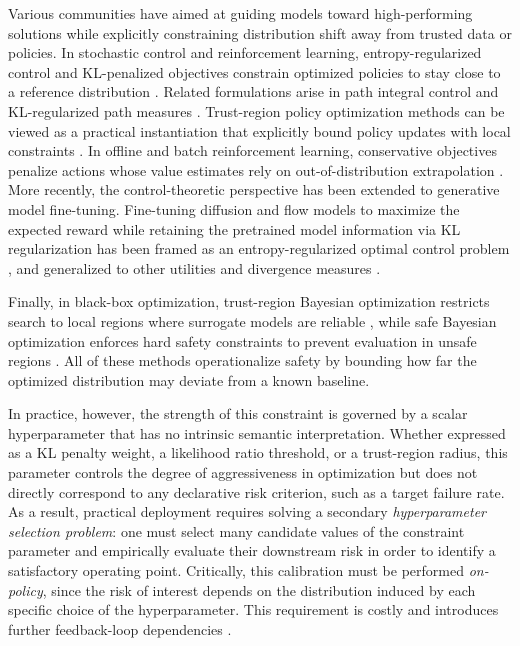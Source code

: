 Various communities have aimed at guiding models toward high-performing solutions while explicitly constraining distribution shift away from trusted data or policies.
In stochastic control and reinforcement learning, entropy-regularized control and KL-penalized objectives constrain optimized policies to stay close to a reference distribution \citep{todorov2009efficient, fox2015taming}. 
Related formulations arise in path integral control and KL-regularized path measures \citep{kappen2005path, theodorou2010generalized}. 
Trust-region policy optimization methods can be viewed as a practical instantiation that explicitly bound policy updates with local constraints \citep{schulman2015trust, schulman2017proximal}. 
In offline and batch reinforcement learning, conservative objectives penalize actions whose value estimates rely on out-of-distribution extrapolation \citep{kumar2020conservative, trabucco2021conservative}. 
More recently, the control-theoretic perspective has been extended to generative model fine-tuning. Fine-tuning diffusion and flow models to maximize the expected reward while retaining the pretrained model information via KL regularization has been framed as an entropy-regularized optimal control problem \citep{uehara2024fine, domingo2024adjoint}, and generalized to other utilities and divergence measures \citep{de2025flow}. 

Finally, in black-box optimization, trust-region Bayesian optimization restricts search to local regions where surrogate models are reliable \citep{eriksson2019scalable}, while safe Bayesian optimization enforces hard safety constraints to prevent evaluation in unsafe regions \citep{sui2015safe, berkenkamp2016safe, kirschner2019adaptive, berkenkamp2023bayesian}.
All of these methods operationalize safety by bounding how far the optimized distribution may deviate from a known baseline.

In practice, however, the strength of this constraint is governed by a scalar hyperparameter that has no intrinsic semantic interpretation. Whether expressed as a KL penalty weight, a likelihood ratio threshold, or a trust-region radius, this parameter controls the degree of aggressiveness in optimization but does not directly correspond to any declarative risk criterion, such as a target failure rate. As a result, practical deployment requires solving a secondary  \textit{hyperparameter selection problem}: one must select many candidate values of the constraint parameter and empirically evaluate their downstream risk in order to identify a satisfactory operating point. Critically, this calibration must be performed \textit{on-policy}, since the risk of interest depends on the distribution induced by each specific choice of the hyperparameter. This requirement is costly and introduces further feedback-loop dependencies \citep{bergstra2011algorithms, feurer2019hyperparameter}.

